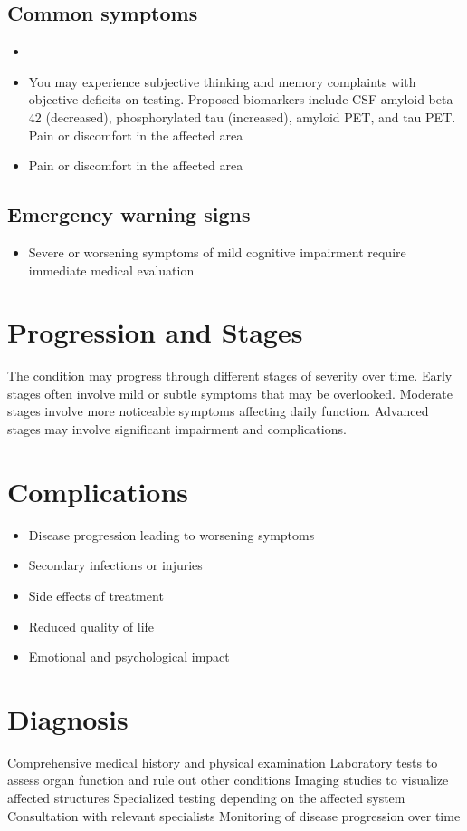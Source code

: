 \subsection{Common symptoms}
\begin{itemize}[noitemsep]
  \item \item You may experience subjective thinking and memory complaints with objective deficits on testing. Proposed biomarkers include CSF amyloid-beta 42 (decreased), phosphorylated tau (increased), amyloid PET, and tau PET. Pain or discomfort in the affected area    \item Pain or discomfort in the affected area
  \end{itemize}
\subsection{Emergency warning signs}
\begin{itemize}[noitemsep]
  \item Severe or worsening symptoms of mild cognitive impairment require immediate medical evaluation
\end{itemize}
\section{Progression and Stages}
The condition may progress through different stages of severity over time. Early stages often involve mild or subtle symptoms that may be overlooked. Moderate stages involve more noticeable symptoms affecting daily function. Advanced stages may involve significant impairment and complications.
\section{Complications}
\begin{itemize}[noitemsep]
  \item Disease progression leading to worsening symptoms
  \item Secondary infections or injuries
  \item Side effects of treatment
  \item Reduced quality of life
  \item Emotional and psychological impact
\end{itemize}
\section{Diagnosis}
Comprehensive medical history and physical examination Laboratory tests to assess organ function and rule out other conditions Imaging studies to visualize affected structures Specialized testing depending on the affected system Consultation with relevant specialists Monitoring of disease progression over time

